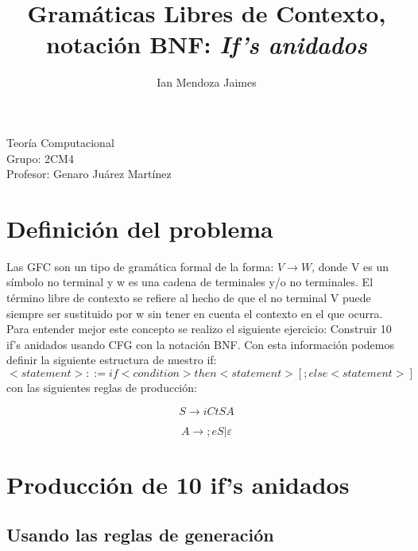 \documentclass[11pt]{article}
\title{Gramáticas Libres de Contexto, notación BNF: \textit{If's anidados}}
\author{Ian Mendoza Jaimes}
\begin{document}
\maketitle

\begin{center}

Teoría Computacional\\

Grupo: 2CM4\\

Profesor: Genaro Juárez Martínez\\
\end{center}

\newpage


\section{Definición del problema}
Las GFC son un tipo de gramática formal de la forma: $V \rightarrow W$, donde V es un símbolo no terminal y w es una cadena de terminales y/o no terminales. El término libre de contexto se refiere al hecho de que el no terminal V puede siempre ser sustituido por w sin tener en cuenta el contexto en el que ocurra.\\

Para entender mejor este concepto se realizo el siguiente ejercicio: Construir 10 if's anidados usando CFG con la notación BNF. Con esta información podemos definir la siguiente estructura de nuestro if: \[ <statement> ::= if <condition> then <statement> [; else <statement>] \] con las siguientes reglas de producción: 

\begin{equation}
S \rightarrow iCtSA
\end{equation}

\begin{equation}
A \rightarrow ;eS | \varepsilon
\end{equation}

\vspace{1em}

\section{Producción de 10 if's anidados}

\subsection{Usando las reglas de generación}
\end{document}
